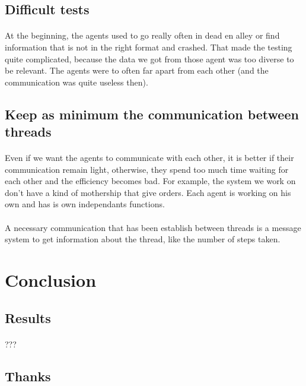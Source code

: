 \documentclass{article}
\begin{document}
	\subsection{Difficult tests}
		\paragraph{}
			At the beginning, the agents used to go really often in dead en alley
			or find information that is not in the right format and crashed.
			That made the testing quite complicated, because the data we got from those agent was too diverse to be relevant.
			The agents were to often far apart from each other (and the communication was quite useless then).
	\subsection{Keep as minimum the communication between threads}
		\paragraph{}
			Even if we want the agents to communicate with each other, it is better if their communication remain light,
			otherwise, they spend too much time waiting for each other and the efficiency becomes bad.
			For example, the system we work on don't have a kind of mothership that give orders.
			Each agent is working on his own and has is own independants functions.
		\paragraph{}
			A necessary communication that has been establish between threads is a message system to get information about the thread,
			like the number of steps taken.

\newpage
\section{Conclusion}
	\subsection{Results}
		\paragraph{}
			???
	\subsection{Thanks}
\end{document}

